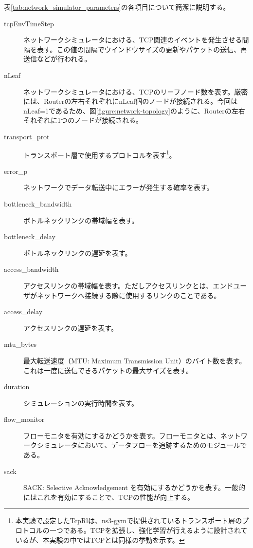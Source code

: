 \documentclass[a4paper,11pt]{jreport}
\newcommand{\figref}[1]{図\ref{#1}}
\newcommand{\tabref}[1]{表\ref{#1}}
\begin{document}
\tabref{tab:network_simulator_parameters}の各項目について簡潔に説明する。
\begin{description}
  \item[tcpEnvTimeStep] ネットワークシミュレータにおける、TCP関連のイベントを発生させる間隔を表す。この値の間隔でウインドウサイズの更新やパケットの送信、再送信などが行われる。
  \item[nLeaf] ネットワークシミュレータにおける、TCPのリーフノード数を表す。厳密には、Routerの左右それぞれにnLeaf個のノードが接続される。今回はnLeaf=1であるため、\figref{figure:network-topology}のように、Routerの左右それぞれに1つのノードが接続される。
  \item[transport\_prot] トランスポート層で使用するプロトコルを表す\footnote{本実験で設定したTcpRlは、ns3-gymで提供されているトランスポート層のプロトコルの一つである。TCPを拡張し、強化学習が行えるように設計されているが、本実験の中ではTCPとは同様の挙動を示す。}。
  \item[error\_p] ネットワークでデータ転送中にエラーが発生する確率を表す。
  \item[bottleneck\_bandwidth] ボトルネックリンクの帯域幅を表す。
  \item[bottleneck\_delay] ボトルネックリンクの遅延を表す。
  \item[access\_bandwidth] アクセスリンクの帯域幅を表す。ただしアクセスリンクとは、エンドユーザがネットワークへ接続する際に使用するリンクのことである。
  \item[access\_delay] アクセスリンクの遅延を表す。
  \item[mtu\_bytes] 最大転送速度（MTU: Maximum Transmission Unit）のバイト数を表す。これは一度に送信できるパケットの最大サイズを表す。
  \item[duration] シミュレーションの実行時間を表す。
  \item[flow\_monitor] フローモニタを有効にするかどうかを表す。フローモニタとは、ネットワークシミュレータにおいて、データフローを追跡するためのモジュールである。
  \item[sack] SACK: Selective Acknowledgement を有効にするかどうかを表す。一般的にはこれを有効にすることで、TCPの性能が向上する。
\end{description}
\end{document}
